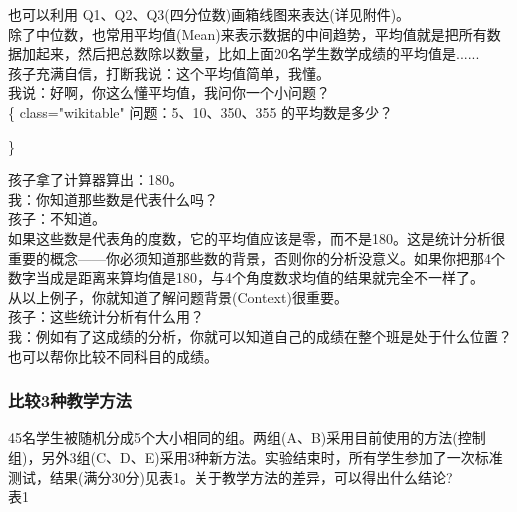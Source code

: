 也可以利用 Q1、Q2、Q3(四分位数)画箱线图来表达(详见附件)。\\
除了中位数，也常用平均值(Mean)来表示数据的中间趋势，平均值就是把所有数据加起来，然后把总数除以数量，比如上面20名学生数学成绩的平均值是......\\
孩子充满自信，打断我说：这个平均值简单，我懂。\\
我说：好啊，你这么懂平均值，我问你一个小问题？\\
\{\textbar{} class="wikitable" \textbar{} 问题：5、10、350、355
的平均数是多少？

\textbar{}\}

孩子拿了计算器算出：180。\\
我：你知道那些数是代表什么吗？\\
孩子：不知道。\\
如果这些数是代表角的度数，它的平均值应该是零，而不是180。这是统计分析很重要的概念------你必须知道那些数的背景，否则你的分析没意义。如果你把那4个数字当成是距离来算均值是180，与4个角度数求均值的结果就完全不一样了。\\
从以上例子，你就知道了解问题背景(Context)很重要。\\
孩子：这些统计分析有什么用？\\
我：例如有了这成绩的分析，你就可以知道自己的成绩在整个班是处于什么位置？也可以帮你比较不同科目的成绩。

\hypertarget{ux6bd4ux8f833ux79cdux6559ux5b66ux65b9ux6cd5}{%
\subsubsection{比较3种教学方法}\label{ux6bd4ux8f833ux79cdux6559ux5b66ux65b9ux6cd5}}

45名学生被随机分成5个大小相同的组。两组(A、B)采用目前使用的方法(控制组)，另外3组(C、D、E)采用3种新方法。实验结束时，所有学生参加了一次标准测试，结果(满分30分)见表1。关于教学方法的差异，可以得出什么结论?\\
表1


